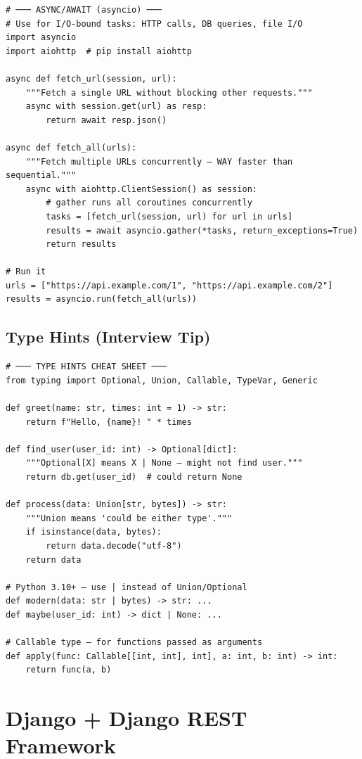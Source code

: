 \documentclass[10pt, a4paper]{article}
\begin{document}
\begin{lstlisting}[language=mypython]
# ─── ASYNC/AWAIT (asyncio) ───
# Use for I/O-bound tasks: HTTP calls, DB queries, file I/O
import asyncio
import aiohttp  # pip install aiohttp

async def fetch_url(session, url):
    """Fetch a single URL without blocking other requests."""
    async with session.get(url) as resp:
        return await resp.json()

async def fetch_all(urls):
    """Fetch multiple URLs concurrently — WAY faster than sequential."""
    async with aiohttp.ClientSession() as session:
        # gather runs all coroutines concurrently
        tasks = [fetch_url(session, url) for url in urls]
        results = await asyncio.gather(*tasks, return_exceptions=True)
        return results

# Run it
urls = ["https://api.example.com/1", "https://api.example.com/2"]
results = asyncio.run(fetch_all(urls))
\end{lstlisting}


\subsection{Type Hints (Interview Tip)}


\begin{lstlisting}[language=mypython]
# ─── TYPE HINTS CHEAT SHEET ───
from typing import Optional, Union, Callable, TypeVar, Generic

def greet(name: str, times: int = 1) -> str:
    return f"Hello, {name}! " * times

def find_user(user_id: int) -> Optional[dict]:
    """Optional[X] means X | None — might not find user."""
    return db.get(user_id)  # could return None

def process(data: Union[str, bytes]) -> str:
    """Union means 'could be either type'."""
    if isinstance(data, bytes):
        return data.decode("utf-8")
    return data

# Python 3.10+ — use | instead of Union/Optional
def modern(data: str | bytes) -> str: ...
def maybe(user_id: int) -> dict | None: ...

# Callable type — for functions passed as arguments
def apply(func: Callable[[int, int], int], a: int, b: int) -> int:
    return func(a, b)
\end{lstlisting}


\bigskip


\section{Django + Django REST Framework}
\end{document}
